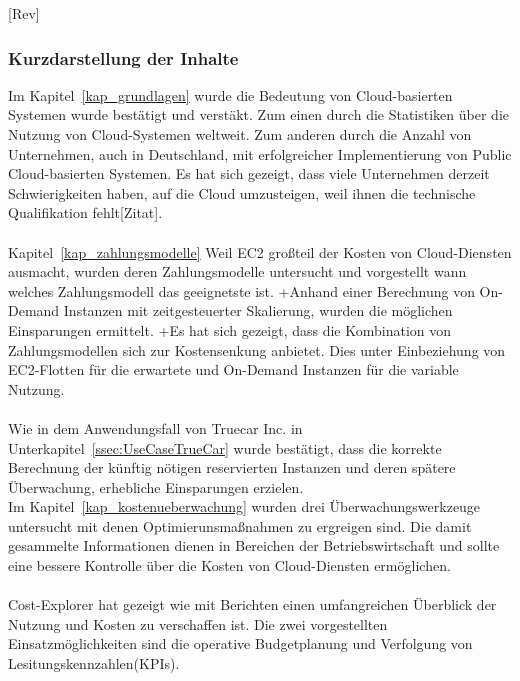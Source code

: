 [Rev]
\subsubsection*{Kurzdarstellung der Inhalte}
Im Kapitel~\ref{kap_grundlagen} %
 wurde die Bedeutung von Cloud-basierten Systemen wurde bestätigt und verstäkt. Zum einen durch die Statistiken\cite{STA1,STA2,STA4} über die Nutzung von Cloud-Systemen weltweit. Zum anderen durch die Anzahl von Unternehmen, auch in Deutschland\cite{ACC2}, mit erfolgreicher Implementierung von Public Cloud-basierten Systemen. Es hat sich gezeigt, dass viele Unternehmen derzeit Schwierigkeiten haben, auf die Cloud umzusteigen, weil ihnen die technische Qualifikation fehlt[Zitat]. 
\\\\
Kapitel~\ref{kap_zahlungsmodelle} Weil EC2 großteil der Kosten von Cloud-Diensten ausmacht, wurden deren Zahlungsmodelle untersucht und vorgestellt wann welches Zahlungsmodell das geeignetste ist. 
+Anhand einer Berechnung von On-Demand Instanzen mit zeitgesteuerter Skalierung, wurden die möglichen Einsparungen ermittelt. +Es hat sich gezeigt, dass die Kombination von Zahlungsmodellen sich zur Kostensenkung anbietet. Dies unter Einbeziehung von EC2-Flotten für die erwartete und On-Demand Instanzen für die variable Nutzung.%
%
\\\\
Wie in dem Anwendungsfall von Truecar Inc. in Unterkapitel~\ref{ssec:UseCaseTrueCar} %
wurde bestätigt, dass die korrekte Berechnung der künftig nötigen reservierten Instanzen und deren spätere Überwachung, erhebliche Einsparungen erzielen.
\\
Im Kapitel~\ref{kap_kostenueberwachung} wurden drei Überwachungswerkzeuge untersucht mit denen Optimierunsmaßnahmen zu ergreigen sind. Die damit gesammelte Informationen dienen in Bereichen der Betriebswirtschaft und sollte eine bessere Kontrolle über die Kosten von Cloud-Diensten ermöglichen.
\\\\
Cost-Explorer hat gezeigt wie mit Berichten einen umfangreichen Überblick der Nutzung und Kosten zu verschaffen ist. Die zwei vorgestellten Einsatzmöglichkeiten sind die operative Budgetplanung und Verfolgung von Lesitungskennzahlen(KPIs).
